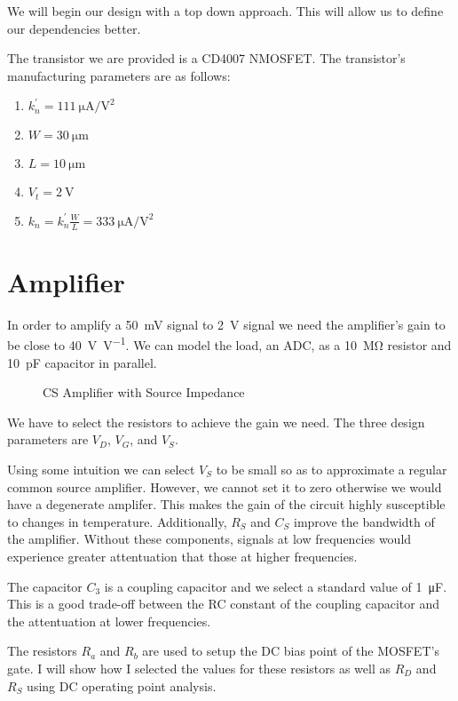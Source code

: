 \documentclass[journal]{IEEEtran}
\begin{document}
We will begin our design with a top down approach. This will allow us to define our dependencies better.

The transistor we are provided is a CD4007 NMOSFET. The transistor's manufacturing parameters are as follows:

\begin{enumerate}
	\item $k_n^{'}=\SI{111}{\micro\ampere\per\volt\squared}$
	\item $W=\SI{30}{\micro\meter}$
	\item $L=\SI{10}{\micro\meter}$
	\item $V_t=\SI{2}{\volt}$
	\item $k_n = k_n^{'} \frac{W}{L} = \SI{333}{\micro\ampere\per\volt\squared}$
\end{enumerate}

\section{Amplifier}
In order to amplify a \SI{50}{\milli\volt} signal to \SI{2}{\volt} signal we need the amplifier's gain to be close to \SI[per-mode=symbol]{40}{\volt\per\volt}. We can model the load, an ADC, as a \SI{10}{\mega\ohm} resistor and \SI{10}{\pico\farad} capacitor in parallel.

\begin{figure}[H]
	\centering
	
	\caption{CS Amplifier with Source Impedance\cite{roberts_2017_amps}}
	\label{amp}
\end{figure}

We have to select the resistors to achieve the gain we need. The three design parameters are $V_D$, $V_G$, and $V_S$. 

Using some intuition we can select $V_S$ to be small so as to approximate a regular common source amplifier. However, we cannot set it to zero otherwise we would have a degenerate amplifer. This makes the gain of the circuit highly susceptible to changes in temperature. Additionally, $R_S$ and $C_S$ improve the bandwidth of the amplifier. Without these components, signals at low frequencies would experience greater attentuation that those at higher frequencies.

The capacitor $C_3$ is a coupling capacitor and we select a standard value of \SI{1}{\micro\farad}. This is a good trade-off between the RC constant of the coupling capacitor and the attentuation at lower frequencies.

The resistors $R_a$ and $R_b$ are used to setup the DC bias point of the MOSFET's gate. I will show how I selected the values for these resistors as well as $R_D$ and $R_S$ using DC operating point analysis.
\end{document}
